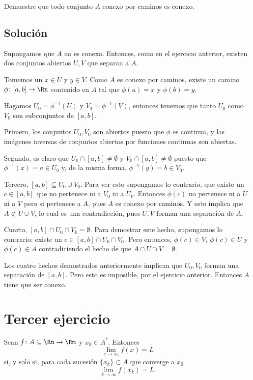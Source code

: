 \documentclass{scrartcl}
\begin{document}
Demuestre que todo conjunto \(A\) conexo por caminos es conexo.

\subsection{Solución}

Supongamos que \(A\) no es conexo.
Entonces, como en el ejercicio anterior,
existen dos conjuntos abiertos \(U,V\)
que separan a \(A\).

Tomemos un \(x \in U\) y \(y\in V\).
Como \(A\) es conexo por caminos, existe un camino
\(\phi \colon [a,b]\to \Rn\) contenido en \(A\) tal que
\(\phi(a) = x\) y \(\phi(b) = y\).

Hagamos \(U_0=\phi^{-1}(U)\) y \(V_0 = \phi^{-1}(V)\),
entonces tenemos que tanto \(U_0\) como \(V_0\) son
subconjuntos de \([a,b]\).

Primero, los conjuntos \(U_0, V_0\) son abiertos
puesto que \(\phi\) es continua, y las imágenes
inversas de conjuntos abiertos por funciones continuas
son abiertas.

Segundo, es claro que \(U_0\cap[a,b]\neq\emptyset\)
y \(V_0\cap[a,b]\neq\emptyset\) puesto que
\(\phi^{-1}(x) = a \in U_0\) y, de la misma forma,
\(\phi^{-1}(y) = b \in V_0\).

Tercero, \([a,b] \subseteq U_0\cup V_0\).
Para ver esto supongamos lo contrario,
que existe un \(c\in [a,b]\) que no pertenece
ni a \(V_0\) ni a \(U_0\).
Entonces \(\phi(c)\) no pertenece ni a \(U\) ni
a \(V\) pero si pertenece a \(A\), pues \(A\)
es conexo por caminos. Y esto implica que
\(A\not\subset U\cup V\), lo cual es una contradicción,
pues \(U,V\) forman una separación de \(A\).

Cuarto, \([a,b]\cap U_0\cap V_0 = \emptyset\).
Para demostrar este hecho, supongamos lo contrario:
existe un \(c\in[a,b]\cap U_0\cap V_0\). Pero entonces,
\(\phi(c)\in V\), \(\phi(c)\in U\) y \(\phi(c)\in A\)
contradiciendo el hecho de que \(A\cap U\cap V = \emptyset\).

Los cuatro hechos demostrados anteriormente
implican que \(U_0,V_0\) forman una separación de
\([a,b]\). Pero esto es imposible, por el ejercicio anterior.
Entonces \(A\) tiene que ser conexo.

\section{Tercer ejercicio}

Sean \(f\colon A\subseteq\Rn\to\Rm\) y \(x_0\in A^*\).
Entonces
\[\lim_{x\to x_0}f(x) = L\]
si, y solo si, para cada sucesión \(\{x_k\}\subset A\)
que converge a \(x_0\)
\[\lim_{k\to\infty} f(x_k) = L.\]
\end{document}
